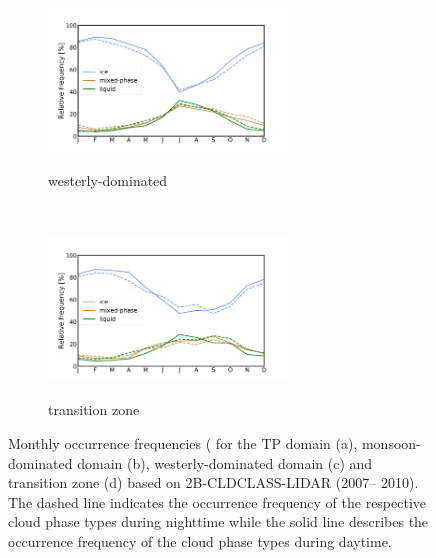 \documentclass[alpha-refs]{wiley-article}
\begin{document}
\begin{figure}[!htbp]
    \begin{subfigure}[b]{0.5\textwidth}
        \centering
        \caption{westerly-dominated}        
        \includegraphics[height=1.5in]{monthly_cldphase_westerlymode.png}
  \label{fig:monthly_cldphase3}
    \end{subfigure}%
        ~ 
    \begin{subfigure}[b]{0.5\textwidth}
        \centering
        \caption{transition zone } 
        \includegraphics[height=1.5in]{monthly_cldphase_transitionzone.png}
  \label{fig:monthly_cldphase4}
    \end{subfigure}
    \caption{Monthly occurrence frequencies (%
for the TP domain (a), monsoon-dominated domain (b), westerly-dominated domain (c)
and transition zone (d) based on 2B-CLDCLASS-LIDAR (2007– 2010). The dashed line
indicates the occurrence frequency of the respective cloud phase types during nighttime
while the solid line describes the occurrence frequency of the cloud phase types during
daytime.}
    \label{fig:monthly_cldphase}
\end{figure}
\end{document}
